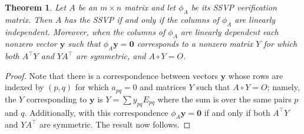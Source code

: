 \documentclass[preprint,12pt]{elsarticle}
\newcommand{\trans  }{^\top}
\newtheorem{theorem}{Theorem}[section]
\begin{document}
\begin{theorem}
Let $A$ be an $m\times n$ matrix and let $\phi_A$ be its SSVP verification matrix.
Then $A$ has the SSVP if and only if the columns of $\phi_A$ are linearly independent.
Moreover, when the columns of $\phi_A$ are linearly dependent each nonzero vector  $\mathbf y$ such that 
$\phi_A \mathbf y={ \mathbf 0}$ corresponds to a nonzero matrix $Y$ for which both $A\trans Y$ and $Y A\trans$ are symmetric, and $A \circ Y=O$.  
\end{theorem}

\begin{proof}
Note that there is a correspondence between 
vectors $\mathbf y$ whose rows are indexed by  $(p,q)$ for which  $a_{pq}=0$ and matrices $Y$ such that $A\circ Y=O$; namely, the $Y$ corresponding to $\mathbf y$ is 
$Y=\sum y_{pq} E_{pq}$ where the sum is over the same pairs $p$ and $q$. Additionally, with this correspondence $\phi_A \mathbf y=\mathbf 0 $ if and only if both $A\trans Y$ and $Y A\trans $ are symmetric. The result now follows. 

\end{proof}
\end{document}
